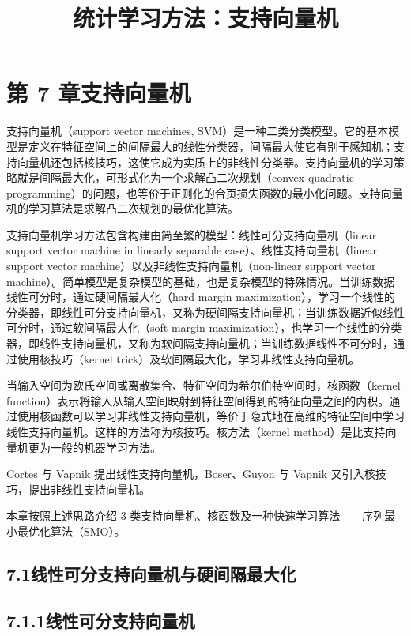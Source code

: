 \documentclass[UTF8,12pt,a4paper,fontset=fandol]{ctexart}
\title{统计学习方法：支持向量机}
\author{}
\date{}
\begin{document}
\maketitle

\section*{第 7 章\quad 支持向量机}

支持向量机（support vector machines, SVM）是一种二类分类模型。它的基本模型是定义在特征空间上的间隔最大的线性分类器，间隔最大使它有别于感知机；支持向量机还包括核技巧，这使它成为实质上的非线性分类器。支持向量机的学习策略就是间隔最大化，可形式化为一个求解凸二次规划（convex quadratic programming）的问题，也等价于正则化的合页损失函数的最小化问题。支持向量机的学习算法是求解凸二次规划的最优化算法。

支持向量机学习方法包含构建由简至繁的模型：线性可分支持向量机（linear support vector machine in linearly separable case）、线性支持向量机（linear support vector machine）以及非线性支持向量机（non-linear support vector machine）。简单模型是复杂模型的基础，也是复杂模型的特殊情况。当训练数据线性可分时，通过硬间隔最大化（hard margin maximization），学习一个线性的分类器，即线性可分支持向量机，又称为硬间隔支持向量机；当训练数据近似线性可分时，通过软间隔最大化（soft margin maximization），也学习一个线性的分类器，即线性支持向量机，又称为软间隔支持向量机；当训练数据线性不可分时，通过使用核技巧（kernel trick）及软间隔最大化，学习非线性支持向量机。

当输入空间为欧氏空间或离散集合、特征空间为希尔伯特空间时，核函数（kernel function）表示将输入从输入空间映射到特征空间得到的特征向量之间的内积。通过使用核函数可以学习非线性支持向量机，等价于隐式地在高维的特征空间中学习线性支持向量机。这样的方法称为核技巧。核方法（kernel method）是比支持向量机更为一般的机器学习方法。

Cortes 与 Vapnik 提出线性支持向量机，Boser、Guyon 与 Vapnik 又引入核技巧，提出非线性支持向量机。

本章按照上述思路介绍 3 类支持向量机、核函数及一种快速学习算法——序列最小最优化算法（SMO）。

\subsection*{7.1\quad 线性可分支持向量机与硬间隔最大化}

\subsection*{7.1.1\quad 线性可分支持向量机}
\end{document}
